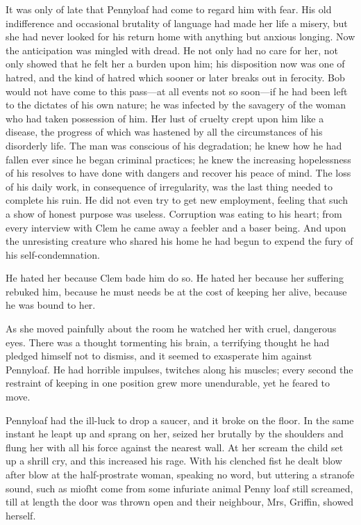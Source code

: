 It was only of late that Pennyloaf had come to regard him with fear. His
old indifference and occasional brutality of language had made her life
a misery, but she had never looked for his return home with anything but
anxious longing. Now the anticipation was mingled with dread. He not
only had no care for her, not only showed that he felt her a burden upon
him; his disposition now was one of hatred, and the kind of hatred which
sooner or later breaks out in ferocity. Bob would not have come to this
pass---at all events not so soon---if he had been left to the dictates
of his own nature; he was infected by the savagery of the woman who had
taken possession of him. Her lust of cruelty crept upon him like a
disease, the progress of which was hastened by all the circumstances of
his disorderly life. The man was conscious of his degradation; he knew
how he had fallen ever since he began criminal practices; he knew the
increasing hopelessness of his resolves to have done with dangers and
recover his peace of mind. The loss of his daily work, in consequence of
irregularity, was the last thing needed to complete
{\protect\hypertarget{187}{}{}}his ruin. He did not even try to get new
employment, feeling that such a show of honest purpose was useless.
Corruption was eating to his heart; from every interview with Clem he
came away a feebler and a baser being. And upon the unresisting creature
who shared his home he had begun to expend the fury of his
self-condemnation.

He hated her because Clem bade him do so. He hated her because her
suffering rebuked him, because he must needs be at the cost of keeping
her alive, because he was bound to her.

As she moved painfully about the room he watched her with cruel,
dangerous eyes. There was a thought tormenting his brain, a terrifying
thought he had pledged himself not to dismiss, and it seemed to
exasperate him against Pennyloaf. He had horrible impulses, twitches
along his muscles; every second the restraint of keeping in one position
grew more unendurable, yet he feared to move.

Pennyloaf had the ill-luck to drop a saucer, and it broke on the floor.
In the same instant he leapt up and sprang on her, seized her brutally
by the shoulders and flung her with all his force against the nearest
wall. At her {\protect\hypertarget{188}{}{}}scream the child set up a
shrill cry, and this increased his rage. With his clenched fist he dealt
blow after blow at the half-prostrate woman, speaking no word, but
uttering a stranofe sound, such as miofht come from some infuriate
animal Penny loaf still screamed, till at length the door was thrown
open and their neighbour, Mrs, Griffin, showed herself.

